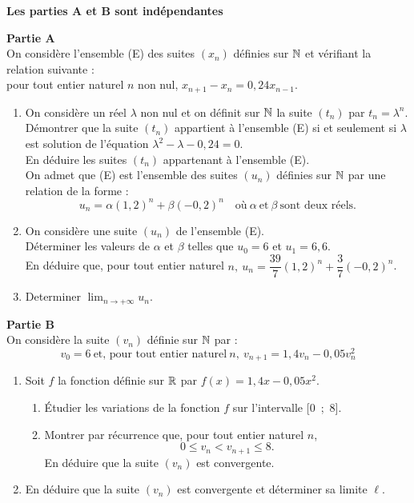 \documentclass[a4paper,11pt,DIV12,BCOR0mm]{scrartcl}
\begin{document}
\begin{exercice}
\noindent\textbf{Les parties A et B sont indépendantes}

\noindent \textbf{Partie A}\\
On considère l'ensemble (E) des suites $\left(x_{n}\right)$ définies sur $\mathbb{N}$ et vérifiant la relation suivante :\\
pour tout entier naturel $n$ non nul, $x_{n+1} - x_{n} = 0,24x_{n-1}$.

\begin{enumerate}
\item  On considère un réel $\lambda$ non nul et on définit sur $\mathbb{N}$ la suite $\left(t_{n}\right)$ par $t_{n} = \lambda^n$.\\
Démontrer que la suite $\left(t_{n}\right)$ appartient à l'ensemble (E) si et seulement si $\lambda$ est solution de l'équation $\lambda^2 - \lambda - 0,24 = 0$.\\
En déduire les suites $\left(t_{n}\right)$ appartenant à l'ensemble (E).\\

On admet que (E) est l'ensemble des suites $\left(u_{n}\right)$ définies sur $\mathbb{N}$ par une relation de la forme :
\[u_{n} = \alpha(1,2)^n + \beta(-0,2)^n \quad  	\text{où}~ \alpha~ \text{et}~\beta~ \text{sont deux réels.}\]

\item  On considère une suite $\left(u_{n}\right)$ de l'ensemble (E).\\
Déterminer les valeurs de $\alpha$ et $\beta$ telles que $u_{0} = 6$ et $u_{1} =  6,6$.\\
En déduire que, pour tout entier naturel $n,~ u_{n} = \dfrac{39}{7}(1,2)^n + \dfrac{3}{7}(-0,2)^n$.

\item  Determiner $\displaystyle\lim_{n \to + \infty} u_{n}$.
\end{enumerate}


\noindent \textbf{Partie B}\\
On considère la suite $\left(v_{n}\right)$ définie sur $\mathbb{N}$ par :
\[v_{0} =  6~ \text{et, pour tout entier naturel}~ n,~v_{n+1} =  1,4v_{n} - 0,05v_{n}^2\]

\begin{enumerate}
\item  Soit $f$ la fonction définie sur $\mathbb{R}$ par $f(x) = 1,4x - 0,05x^2$.
	\begin{enumerate}
		\item  Étudier les variations de la fonction $f$ sur l'intervalle [0~;~8].
		\item  Montrer par récurrence que, pour tout entier naturel $n$,\[
 0 \leqslant  v_{n} < v_{n+1} \leqslant  8.\] En déduire que la suite $\left(v_{n}\right)$ est convergente.
	\end{enumerate}
\item En déduire que la suite $(v_n)$ est convergente et déterminer sa limite $\ell$.
\end{enumerate}
\end{exercice}
\end{document}
